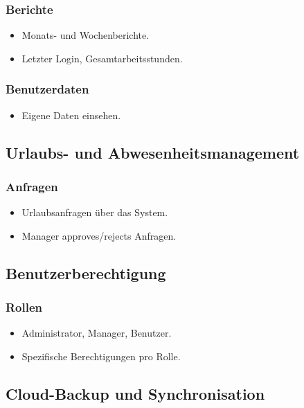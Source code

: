 \documentclass[../main.tex]{subfiles}
\begin{document}
\subsubsection{Berichte}
\begin{itemize}
  \item Monats- und Wochenberichte.
  \item Letzter Login, Gesamtarbeitsstunden.
\end{itemize}

\subsubsection{Benutzerdaten}
\begin{itemize}
  \item Eigene Daten einsehen.
\end{itemize}

\subsection{Urlaubs- und Abwesenheitsmanagement}

\subsubsection{Anfragen}
\begin{itemize}
  \item Urlaubsanfragen über das System.
  \item Manager approves/rejects Anfragen.
\end{itemize}

\subsection{Benutzerberechtigung}

\subsubsection{Rollen}
\begin{itemize}
  \item Administrator, Manager, Benutzer.
  \item Spezifische Berechtigungen pro Rolle.
\end{itemize}

\subsection{Cloud-Backup und Synchronisation}
\end{document}
